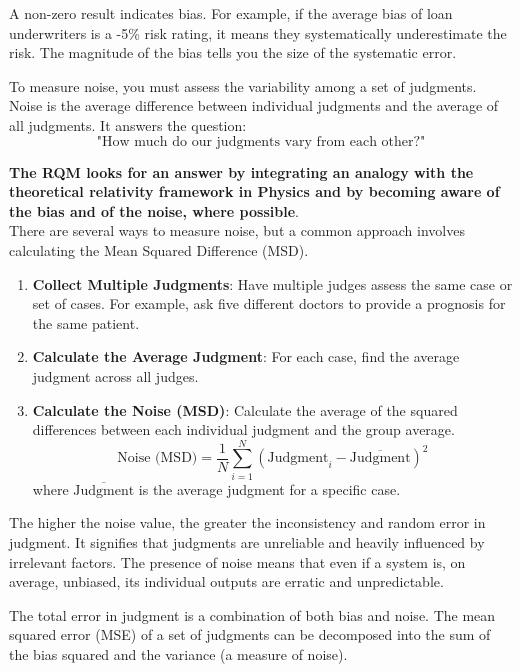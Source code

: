 \documentclass{article}
\begin{document}
 
 A non-zero result indicates bias. For example, if the average bias of loan underwriters is a -5\% risk rating, it means they systematically underestimate the risk. The magnitude of the bias tells you the size of the systematic error.
 
 
 To measure noise, you must assess the variability among a set of judgments. Noise is the average difference between individual judgments and the average of all judgments. It answers the question:
 \begin{equation}
 	\text{"How much do our judgments vary from each other?"}
 \end{equation} 
 
 \textbf{The RQM looks for an answer by integrating an analogy with the theoretical relativity framework in Physics and by becoming aware of the bias and of the noise, where possible}.\\
 There are several ways to measure noise, but a common approach involves calculating the Mean Squared Difference (MSD).
 
 \begin{enumerate}
 	\item \textbf{Collect Multiple Judgments}: Have multiple judges assess the same case or set of cases. For example, ask five different doctors to provide a prognosis for the same patient.
 	\item \textbf{Calculate the Average Judgment}: For each case, find the average judgment across all judges.
 	\item \textbf{Calculate the Noise (MSD)}: Calculate the average of the squared differences between each individual judgment and the group average.
 	$$ \text{Noise (MSD)} = \frac{1}{N} \sum_{i=1}^{N} (\text{Judgment}_i - \overline{\text{Judgment}})^2 $$
 	where $\overline{\text{Judgment}}$ is the average judgment for a specific case.
 \end{enumerate}

 
 The higher the noise value, the greater the inconsistency and random error in judgment. It signifies that judgments are unreliable and heavily influenced by irrelevant factors. The presence of noise means that even if a system is, on average, unbiased, its individual outputs are erratic and unpredictable.

 
 The total error in judgment is a combination of both bias and noise. The mean squared error (MSE) of a set of judgments can be decomposed into the sum of the bias squared and the variance (a measure of noise).
 
\end{document}
